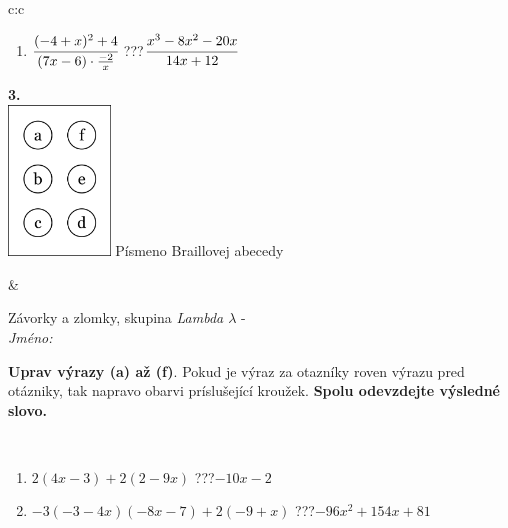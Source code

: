 \documentclass[10pt]{report}
\begin{document}
\begin{tabular}{c:c}
\begin{minipage}[c][104.5mm][t]{0.5\linewidth}
\begin{center}
\begin{minipage}{0.79\linewidth}
\begin{center}
\begin{varwidth}{\linewidth}
\begin{enumerate}
\item $\cfrac{(-4+x)^2+4}{(7x-6)\cdot\frac{-2}{x}}$\quad \dotfill\; ???\;\dotfill \quad $\cfrac{x^3-8x^2-20x}{14x+12}$
\end{enumerate}
\end{varwidth}
\end{center}
\end{minipage}
\begin{minipage}{0.20\linewidth}
\begin{center}
{\Huge\bfseries 3.} \\[2mm]
\includegraphics[height=40mm]{../images/braille.png}
{\small Písmeno Braillovej abecedy}
\end{center}
\end{minipage}
\end{center}
\end{minipage}
&
\begin{minipage}[c][104.5mm][t]{0.5\linewidth}
\begin{center}
\vspace{7mm}
{\huge Závorky a zlomky, skupina \textit{Lambda $\lambda$} -}\\[5mm]
\textit{Jméno:}\phantom{xxxxxxxxxxxxxxxxxxxxxxxxxxxxxxxxxxxxxxxxxxxxxxxxxxxxxxxxxxxxxxxxx}\\[5mm]
\begin{minipage}{0.95\linewidth}
\begin{center}
\textbf{Uprav výrazy (a) až (f)}. Pokud je výraz za otazníky roven výrazu pred otázniky, tak napravo obarvi príslušející kroužek. \textbf{Spolu odevzdejte výsledné slovo.}
\end{center}
\end{minipage}
\\[1mm]
\begin{minipage}{0.79\linewidth}
\begin{center}
\begin{varwidth}{\linewidth}
\begin{enumerate}
\normalsize
\item $2(4x-3)+2(2-9x)$\quad \dotfill\; ???\;\dotfill \quad $-10x-2$
\item $-3(-3-4x)(-8x-7)+2(-9+x)$\quad \dotfill\; ???\;\dotfill \quad $-96x^2+154x+81$

\end{enumerate}
\end{varwidth}
\end{center}
\end{minipage}
\end{center}
\end{minipage}
\end{tabular}
\end{document}
